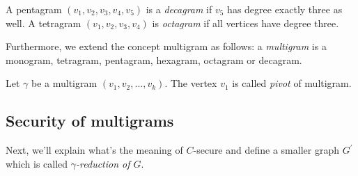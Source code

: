 \begin{definition}
A pentagram $(v_1, v_2, v_3, v_4, v_5)$ is a \textit{decagram} if $v_5$ has degree exactly three as well. A tetragram $(v_1, v_2, v_3, v_4)$ is \textit{octagram} if all vertices have degree three. \cite{dvorak2013threecoloring}
\end{definition}
Furthermore, we extend the concept multigram as follows: a \textit{multigram} is a monogram, tetragram, pentagram, hexagram, octagram or decagram.

\begin{definition}
Let $\gamma$ be a multigram $(v_1, v_2, ..., v_k)$. The vertex $v_1$ is called \textit{pivot} of multigram. \cite{dvorak2013threecoloring}
\end{definition}
\subsection{Security of multigrams}
Next, we'll explain what's the meaning of $C$-secure and define a smaller graph $G^{'}$ which is called \textit{$\gamma$-reduction of $G$}.

